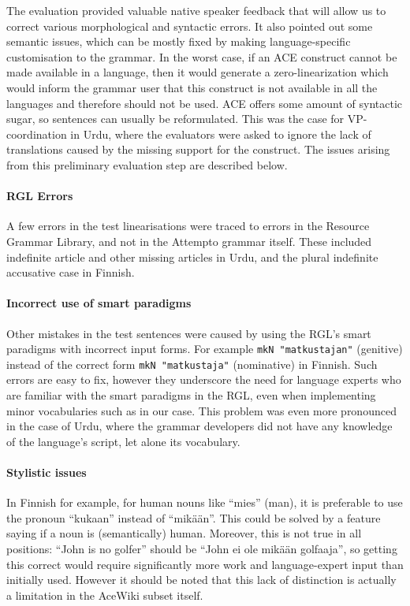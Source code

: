 \documentclass[a4paper]{article}
\begin{document}
The evaluation provided valuable native speaker feedback that will
allow us to correct various morphological and syntactic errors. It
also pointed out some semantic issues, which can be mostly fixed by
making language-specific customisation to the grammar. In the worst
case, if an ACE construct cannot be made available in a language, then
it would generate a zero-linearization which would inform the grammar
user that this construct is not available in all the languages and
therefore should not be used. ACE offers some amount of syntactic
sugar, so sentences can usually be reformulated. This was the case for
VP-coordination in Urdu, where the evaluators were asked to ignore the
lack of translations caused by the missing support for the construct.
The issues arising from this preliminary evaluation step are described
below.

\paragraph{RGL Errors}
A few errors in the test linearisations were traced to errors in the
Resource Grammar Library, and not in the Attempto grammar itself.
These included indefinite article and other missing articles in Urdu,
and the plural indefinite accusative case in Finnish.


\paragraph{Incorrect use of smart paradigms}
Other mistakes in the test sentences were caused by using the RGL's
smart paradigms with incorrect input forms. For example
\verb|mkN "matkustajan"| (genitive) instead of the correct form
\verb|mkN "matkustaja"| (nominative) in Finnish. Such errors are easy to fix,
however they underscore the need for language experts who are familiar
with the smart paradigms in the RGL, even when implementing minor
vocabularies such as in our case. This problem was even more
pronounced in the case of Urdu, where the grammar developers did not
have any knowledge of the language's script, let alone its vocabulary.


\paragraph{Stylistic issues}
In Finnish for example, for human nouns like ``mies'' (man), it is
preferable to use the pronoun ``kukaan'' instead of ``mik\"a\"an''. This
could be solved by a feature saying if a noun is (semantically)
human. Moreover, this is not true in all positions: ``John is no
golfer'' should be ``John ei ole mik\"a\"an golfaaja'', so getting this
correct would require significantly more work and language-expert
input than initially used.  However it should be noted that this lack
of distinction is actually a limitation in the AceWiki subset itself.
\end{document}
